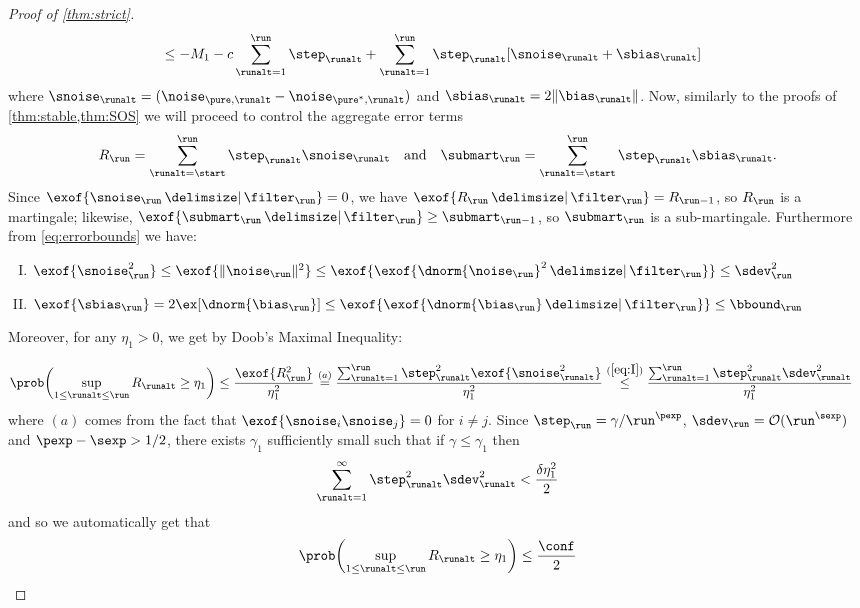 \begin{proof}[Proof of \cref{thm:strict}]
\begin{align}
    &\leq -M_1 -c\sum_{\runalt=1}^{\run}\step_{\runalt} + \sum_{\runalt=1}^{\run}\step_{\runalt}[ \snoise_{\runalt} + \sbias_{\runalt}]
\end{align}
where $\snoise_{\runalt} =  (\noise_{\pure,\runalt} -\noise_{\pure^*,\runalt})$ and $\sbias_{\runalt} =  2\norm{\bias_{\runalt}}$. 
Now, similarly to the proofs of \cref{thm:stable,thm:SOS} we will proceed to control the aggregate error terms 
\begin{equation}
\label{eq:err-agg}
\curr[R]
	= \sum_{\runalt=\start}^{\run} \iter[\step] \iter[\snoise]
	\quad
	\text{and}
	\quad
\curr[\submart]
	= \sum_{\runalt=\start}^{\run} {\iter[\step] \iter[\sbias]}.
\end{equation}
Since $\exof{\curr[\snoise] \given \curr[\filter]} = 0$, we have $\exof{\curr[R] \given \curr[\filter]} = \prev[R]$, so $\curr[R]$ is a martingale;
likewise, $\exof{\curr[\submart] \given \curr[\filter]} \geq \prev[\submart]$, so $\curr[\submart]$ is a sub-martingale. Furthermore from \eqref{eq:errorbounds}  we have:
\begin{enumerate}[I.]
     \item \label{eq:I}     $\exof{\snoise^{2}_\run} \leq  \exof{\norm{\noise_{\run}}^{2}} \leq \exof{\exof{\dnorm{\noise_{\run}}^{2} \given \filter_{\run}}} \leq \sdev^{2}_\run$\vspace{3pt}
     \item \label{eq:II}
     $\exof{\sbias_\run} = 2 \ex\bracks*{\dnorm{\bias_{\run}}}\leq \exof{\exof{\dnorm{\bias_{\run}} \given \filter_{\run}}} \leq \bbound_\run$
 \end{enumerate}

 Moreover, for any $\eta_{1} > 0$, we get by Doob's Maximal Inequality:

 \begin{align}
     \prob\parens*{\sup_{1 \leq \runalt \leq \run}R_{\runalt} \geq \eta_{1}} \leq \frac{\exof{R_{\run}^{2}}}{\eta_1^{2}} \stackrel{(a)}{=} \frac{\sum_{\runalt = 1}^{\run} \step_{\runalt}^{2}\exof{\snoise_{\runalt}^{2}}}{\eta_1^{2}} & \stackrel{(\ref{eq:I})}{\leq}
      \frac{\sum_{\runalt = 1}^{\run} \step_{\runalt}^{2}\sdev^{2}_{\runalt}}{\eta_1^{2}}   
 \end{align}
 where $(a)$ comes from the fact that $\exof{\snoise_i\snoise_j} = 0$ for $i \neq j$.  Since $\step_\run =\gamma/\run^{\pexp}$, $\sdev_\run = \bigoh(\run^{\sexp})$ and  $\pexp-\sexp >1/2$, 
 there exists $\gamma_1$ sufficiently small such that if $\gamma \leq \gamma_1$ then
 \begin{align}\label{eq: condition 1}
    \sum_{\runalt = 1}^{\infty}\step_{\runalt}^{2}\sdev^{2}_{\runalt} < \frac{\delta \eta_1^{2}}{2}
 \end{align}
 and so we automatically get that 
 \begin{equation}\label{eq:mart-prob}
     \prob\parens*{\sup_{1 \leq \runalt \leq \run}R_{\runalt} \geq \eta_{1}} \leq \frac{\conf}{2}
 \end{equation}


\end{proof}
